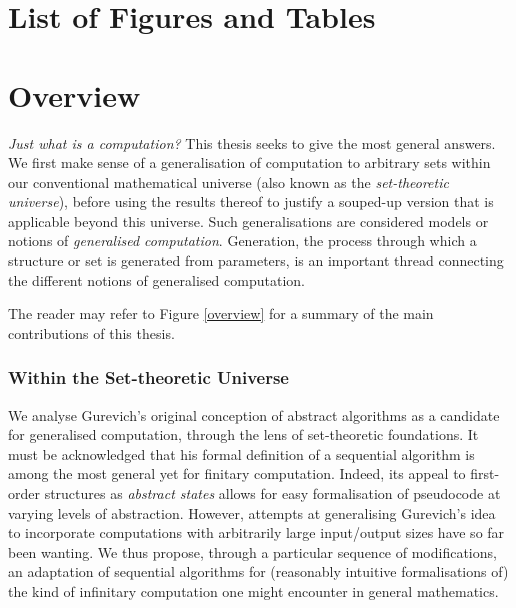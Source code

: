 \documentclass[12pt, twoside]{memoir}
\numberwithin{equation}{section}
\theoremstyle{definition}
\theoremstyle{remark}
\theoremstyle{definition}
\theoremstyle{definition}
\theoremstyle{definition}
\theoremstyle{remark}
\newcommand{\blankpage}{
\newpage
\thispagestyle{empty}
\mbox{}
\newpage
}
\begin{document}
\blankpage

\tableofcontents*

\chapter{List of Figures and Tables}
\thispagestyle{simple}
\listoffigures*
\listoftables*

\clearpage

\chapter{Overview}
\thispagestyle{simple}
\emph{Just what is a computation?} This thesis seeks to give the most general answers. We first make sense of a generalisation of computation to arbitrary sets within our conventional mathematical universe (also known as the \emph{set-theoretic universe}), before using the results thereof to justify a souped-up version that is applicable beyond this universe. Such generalisations are considered models or notions of \textit{generalised computation}. Generation, the process through which a structure or set is generated from parameters, is an important thread connecting the different notions of generalised computation.

The reader may refer to Figure \ref{overview} for a summary of the main contributions of this thesis.

\subsection*{Within the Set-theoretic Universe}

We analyse Gurevich's original conception of abstract algorithms as a candidate for generalised computation, through the lens of set-theoretic foundations. It must be acknowledged that his formal definition of a sequential algorithm is among the most general yet for finitary computation. Indeed, its appeal to first-order structures as \textit{abstract states} allows for easy formalisation of pseudocode at varying levels of abstraction. However, attempts at generalising Gurevich's idea to incorporate computations with arbitrarily large input/output sizes have so far been wanting. We thus propose, through a particular sequence of modifications, an adaptation of sequential algorithms for (reasonably intuitive formalisations of) the kind of infinitary computation one might encounter in general mathematics.  
\end{document}
